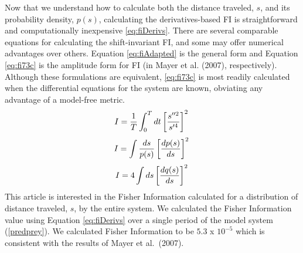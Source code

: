 \documentclass[12pt,twoside]{reedthesis}
\begin{document}
Now that we understand how to calculate both the distance traveled, \(s\), and its probability density, \(p(s)\), calculating the derivatives-based FI is straightforward and computationally inexpensive \eqref{eq:fiDerivs}. There are several comparable equations for calculating the shift-invariant FI, and some may offer numerical advantages over others. Equation \eqref{eq:fiAdapted} is the general form and Equation \eqref{eq:fi73c} is the amplitude form for FI (in Mayer et al. (2007), respectively). Although these formulations are equivalent, \eqref{eq:fi73c} is most readily calculated when the differential equations for the system are known, obviating any advantage of a model-free metric.
\begin{equation}   
    I = \frac{1}{T} \int_0^T dt\left[\frac{s''^2}{s'^4}\right]^2 \\  
  \label{eq:fiDerivs}  
\end{equation}
\begin{equation} 
    I = \int \frac{ds}{p(s)}\left[\frac{dp(s)}{ds}\right]^2  \\
    \label{eq:fiAdapted}
\end{equation}
\begin{equation} 
    I = 4 \int ds\left[\frac{dq(s)}{ds}\right]^2 \\
\label{eq:fi73c}
\end{equation}
This article is interested in the Fisher Information calculated for a distribution of distance traveled, \(s\), by the entire system. We calculated the Fisher Information value using Equation \eqref{eq:fiDerivs} over a single period of the model system (\ref{predprey}). We calculated Fisher Information to be \(5.3\) x \(10^{-5}\) which is consistent with the results of Mayer et al.~(2007).
\end{document}
